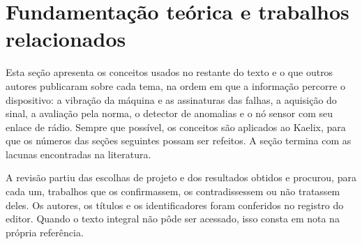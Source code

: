 
\makeatletter
{}
\makeatother

\chapter{Fundamentação teórica e trabalhos relacionados}
\label{cap:fundamentacao}

Esta seção apresenta os conceitos usados no restante do texto e o que outros autores publicaram
sobre cada tema, na ordem em que a informação percorre o dispositivo: a vibração da máquina e as
assinaturas das falhas, a aquisição do sinal, a avaliação pela norma, o detector de anomalias e o
nó sensor com seu enlace de rádio. Sempre que possível, os conceitos são aplicados ao Kaelix, para
que os números das seções seguintes possam ser refeitos. A seção termina com as lacunas encontradas
na literatura.

A revisão partiu das escolhas de projeto e dos resultados obtidos e procurou, para cada um, trabalhos
que os confirmassem, os contradissessem ou não tratassem deles.  Os autores, os títulos e os identificadores
foram conferidos no registro do editor. Quando o texto integral não pôde ser acessado, isso consta em
nota na própria referência. 

